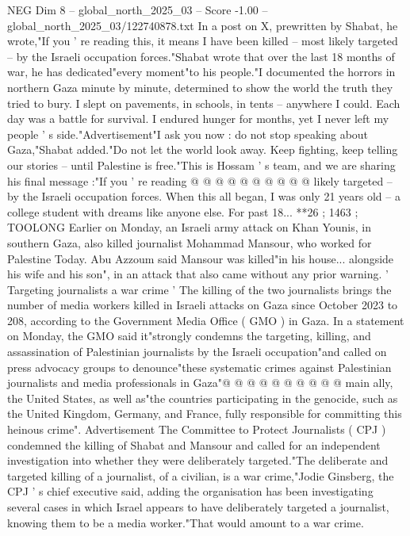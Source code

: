 \begin{textsample}{NEG Dim 8 – global\_north\_2025\_03 – Score -1.00 – global\_north\_2025\_03/122740878.txt}  \label{ex:f8_neg_129}
In a post on X, prewritten by Shabat, he wrote,"If you ' re reading this, it means I have been killed -- most likely targeted -- by the Israeli occupation forces."Shabat wrote that over the last 18 months of war, he has dedicated"every moment"to his people."I documented the horrors in northern Gaza minute by minute, determined to show the world the truth they tried to bury.
I slept on pavements, in schools, in tents -- anywhere I could.
Each day was a battle for survival.
I endured hunger for months, yet I never left my people ' s side."Advertisement"I ask you now : do not stop speaking about Gaza,"Shabat added."Do not let the world look away.
Keep fighting, keep telling our stories -- until Palestine is free."This is Hossam ' s team, and we are sharing his final message :"If you ' re reading @ @ @ @ @ @ @ @ @ @ likely targeted -- by the Israeli occupation forces.
When this all began, I was only 21 years old -- a college student with dreams like anyone else.
For past 18... **26 ; 1463 ; TOOLONG Earlier on Monday, an Israeli army attack on Khan Younis, in southern Gaza, also killed journalist Mohammad Mansour, who worked for Palestine Today.
Abu Azzoum said Mansour was killed"in his house... alongside his wife and his son", in an attack that also came without any prior warning. ' Targeting journalists a war crime ' The killing of the two journalists brings the number of media workers killed in Israeli attacks on Gaza since October 2023 to 208, according to the Government Media Office ( GMO ) in Gaza.
In a statement on Monday, the GMO said it"strongly condemns the targeting, killing, and assassination of Palestinian journalists by the Israeli occupation"and called on press advocacy groups to denounce"these systematic crimes against Palestinian journalists and media professionals in Gaza"@ @ @ @ @ @ @ @ @ @ main ally, the United States, as well as"the countries participating in the genocide, such as the United Kingdom, Germany, and France, fully responsible for committing this heinous crime".
Advertisement The Committee to Protect Journalists ( CPJ ) condemned the killing of Shabat and Mansour and called for an independent investigation into whether they were deliberately targeted."The deliberate and targeted killing of a journalist, of a civilian, is a war crime,"Jodie Ginsberg, the CPJ ' s chief executive said, adding the organisation has been investigating several cases in which Israel appears to have deliberately targeted a journalist, knowing them to be a media worker."That would amount to a war crime.

\end{textsample}
